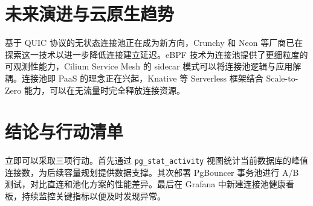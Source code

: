 \chapter{未来演进与云原生趋势}
基于 QUIC 协议的无状态连接池正在成为新方向，Crunchy 和 Neon 等厂商已在探索这一技术以进一步降低连接建立延迟。eBPF 技术为连接池提供了更细粒度的可观测性能力，Cilium Service Mesh 的 sidecar 模式可以将连接池逻辑与应用解耦。连接池即 PaaS 的理念正在兴起，Knative 等 Serverless 框架结合 Scale-to-Zero 能力，可以在无流量时完全释放连接资源。\par
\chapter{结论与行动清单}
立即可以采取三项行动。首先通过 \texttt{pg\_{}stat\_{}activity} 视图统计当前数据库的峰值连接数，为后续容量规划提供数据支撑。其次部署 PgBouncer 事务池进行 A/B 测试，对比直连和池化方案的性能差异。最后在 Grafana 中新建连接池健康看板，持续监控关键指标以便及时发现异常。\par
